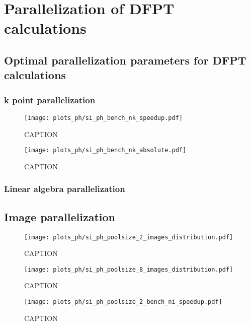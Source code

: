 \documentclass[main.tex]{subfiles}
\begin{document}
\chapter{Parallelization of DFPT calculations}

\section{Optimal parallelization parameters for DFPT calculations}

\subsection{k point parallelization}

\begin{figure}[ht!]
    \centering
    \texttt{[image: plots\_ph/si\_ph\_bench\_nk\_speedup.pdf]}
    \caption{CAPTION}
    \label{fig:scaling_ph_nk_si}
\end{figure}

\begin{figure}[ht!]
    \centering
    \texttt{[image: plots\_ph/si\_ph\_bench\_nk\_absolute.pdf]}
    \caption{CAPTION}
    \label{fig:scaling_ph_nk_si_absolute}
\end{figure}

\subsection{Linear algebra parallelization}

\section{Image parallelization}

\begin{figure}[ht!]
    \centering
    \texttt{[image: plots\_ph/si\_ph\_poolsize\_2\_images\_distribution.pdf]}
    \caption{CAPTION}
    \label{fig:scaling_ph_ni_poolsize_2_si_distribution}
\end{figure}

\begin{figure}[ht!]
    \centering
    \texttt{[image: plots\_ph/si\_ph\_poolsize\_8\_images\_distribution.pdf]}
    \caption{CAPTION}
    \label{fig:scaling_ph_ni_poolsize_8_si_distribution}
\end{figure}

\begin{figure}[ht!]
    \centering
    \texttt{[image: plots\_ph/si\_ph\_poolsize\_2\_bench\_ni\_speedup.pdf]}
    \caption{CAPTION}
    \label{fig:scaling_ph_ni_poolsize_2_si}
\end{figure}
\end{document}
